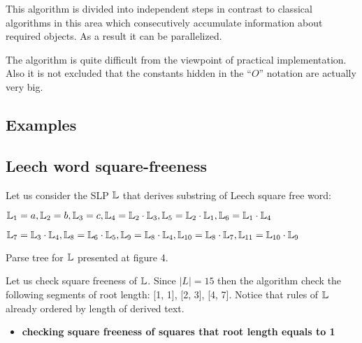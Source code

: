 ﻿\documentclass[11pt]{article}
\begin{document}
\begin{itemize}
\begin{item}
This algorithm is divided into independent steps in contrast to classical algorithms in this area which
consecutively accumulate information about required objects. As a result it can be parallelized.
\end{item}
\begin{item}
The algorithm is quite difficult from the viewpoint of practical implementation. Also it is not excluded that the
constants hidden in the ``$O$'' notation  are actually very big.
\end{item}
\end{itemize}

{}


\begin{appendix}
\section{Examples}

\subsection{Leech word square-freeness}
Let us consider the SLP $\mathbb{L}$ that derives substring of Leech square free word: 

\begin{center}
$\mathbb{L}_{1} = a, \mathbb{L}_{2} = b, \mathbb{L}_{3} = c, \mathbb{L}_{4} = \mathbb{L}_{2} \cdot \mathbb{L}_{3}, \mathbb{L}_{5} = \mathbb{L}_{2} \cdot \mathbb{L}_{1},
\mathbb{L}_{6} = \mathbb{L}_{1} \cdot \mathbb{L}_{4}$

$\mathbb{L}_{7} = \mathbb{L}_{3} \cdot \mathbb{L}_{4}, \mathbb{L}_{8} = \mathbb{L}_{6} \cdot \mathbb{L}_{5}, \mathbb{L}_{9} = \mathbb{L}_{8} \cdot \mathbb{L}_{4}, \mathbb{L}_{10} = \mathbb{L}_{8} \cdot \mathbb{L}_{7},
\mathbb{L}_{11} = \mathbb{L}_{10} \cdot \mathbb{L}_{9}$
\end{center}

Parse tree for $\mathbb{L}$ presented at figure 4.

\begin{figure}[th]
\LeechSLP
\end{figure}

Let us check square freeness of $\mathbb{L}$. Since $|L| = 15$ then the algorithm check the following segments of root
length: [1, 1], [2, 3], [4, 7]. Notice that rules of $\mathbb{L}$ already ordered by length of derived text.

\begin{itemize}
  \item \textbf{checking square freeness of squares that root length equals to 1}
  

\end{itemize}
\end{appendix}
\end{document}

